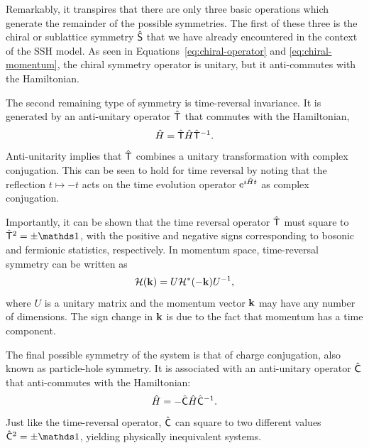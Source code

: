 Remarkably, it transpires that there are only three basic operations which generate the remainder of the possible symmetries.
The first of these three is the chiral or sublattice symmetry $\hat{\mathsf{S}}$ that we have already encountered in the context of the SSH model. As seen in Equations~\eqref{eq:chiral-operator} and \eqref{eq:chiral-momentum}, the chiral symmetry operator is unitary, but it anti-commutes with the Hamiltonian.

The second remaining type of symmetry is time-reversal invariance. It is generated by an anti-unitary operator $\hat{\mathsf{T}}$ that commutes with the Hamiltonian,
\begin{equation*}
	\hat{H} = \hat{\mathsf{T}}\hat{H}\hat{\mathsf{T}}^{-1}.
\end{equation*}
Anti-unitarity implies that $\hat{\mathsf{T}}$ combines a unitary transformation with complex conjugation. This can be seen to hold for time reversal by noting that the reflection $t\mapsto -t$ acts on the time evolution operator $\operatorname{e}^{i\hat{H}t}$ as complex conjugation. 

Importantly, it can be shown that the time reversal operator $\hat{\mathsf{T}}$ must square to $\hat{\TRS}^2=\pm\Id$, with the positive and negative signs corresponding to bosonic and fermionic statistics, respectively. In momentum space, time-reversal symmetry can be written as
\begin{equation*}
	\mathcal{H}(\vb{k}) = U\mathcal{H}^*(-\vb{k})U^{-1},
\end{equation*}
where $U$ is a unitary matrix and the momentum vector $\vb{k}$ may have any number of dimensions. The sign change in $\vb{k}$ is due to the fact that momentum has a time component.

The final possible symmetry of the system is that of charge conjugation, also known as particle-hole symmetry. It is associated with an anti-unitary operator $\hat{\mathsf{C}}$ that anti-commutes with the Hamiltonian:
\begin{equation*}
	\hat{H} = -\hat{\mathsf{C}}\hat{H}\hat{\mathsf{C}}^{-1}.
\end{equation*}
Just like the time-reversal operator, $\hat{\mathsf{C}}$ can square to two different values $\hat{\PHS}^2 = \pm\Id$, yielding physically inequivalent systems.


